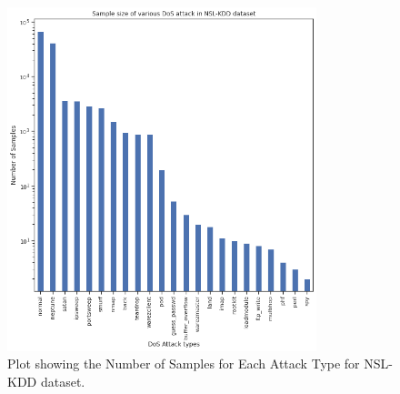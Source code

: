 \documentclass[conference]{IEEEtran}
\begin{document}
\begin{figure}[h]
\includegraphics[width=9cm]{NSL_Sample.png}\par
\caption{Plot showing the Number of Samples for Each Attack Type for NSL-KDD dataset.}
\label{samples_nsl}
\end{figure}
\end{document}
